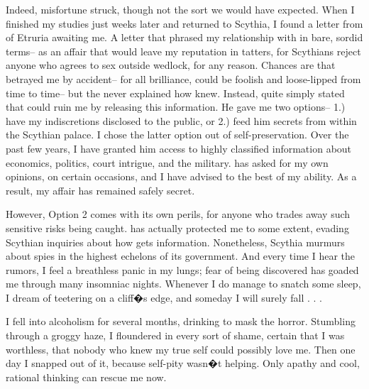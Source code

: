 \documentclass[char]{Kos}
\begin{document}
Indeed, misfortune struck, though not the sort we would have expected. When I finished my studies just weeks later and returned to Scythia, I found a letter from \cEtruriaKing{\Monarch} \cEtruriaKing{\nickname} of Etruria awaiting me. A letter that phrased my relationship with \cPoet{\nickname} in bare, sordid terms-- as an affair that would leave my reputation in tatters, for Scythians reject anyone who agrees to sex outside wedlock, for any reason. Chances are that \cPoet{\nickname} betrayed me by accident-- for all \cPoet{\their} brilliance, \cPoet{\they} could be foolish and loose-lipped from time to time-- but the \cEtruriaKing{\monarch} never explained how \cEtruriaKing{\they} knew. Instead, \cEtruriaKing{\they} quite simply stated that \cEtruriaKing{\they} could ruin me by releasing this information. He gave me two options-- 1.) have my indiscretions disclosed to the public, or 2.) feed him secrets from within the Scythian palace. I chose the latter option out of self-preservation. Over the past few years, I have granted him access to highly classified information about economics, politics, court intrigue, and the military. \cEtruriaKing{\They} has asked for my own opinions, on certain occasions, and I have advised \cEtruriaKing{\them} to the best of my ability. As a result, my affair has remained safely secret. 

However, Option 2 comes with its own perils, for anyone who trades away such sensitive risks being caught. \cEtruriaKing{}  has actually protected me to some extent, evading Scythian inquiries about how \cEtruriaKing{\they} gets \cEtruriaKing{\their} information. Nonetheless, Scythia murmurs about spies in the highest echelons of its government. And every time I hear the rumors, I feel a breathless panic in my lungs; fear of being discovered has goaded me through many insomniac nights. Whenever I do manage to snatch some sleep, I dream of teetering on a cliff�s edge, and someday I will surely fall . . .

I fell into alcoholism for several months, drinking to mask the horror. Stumbling through a groggy haze, I floundered in every sort of shame, certain that I was worthless, that nobody who knew my true self could possibly love me. Then one day I snapped out of it, because self-pity wasn�t helping. Only apathy and cool, rational thinking can rescue me now.
\end{document}
